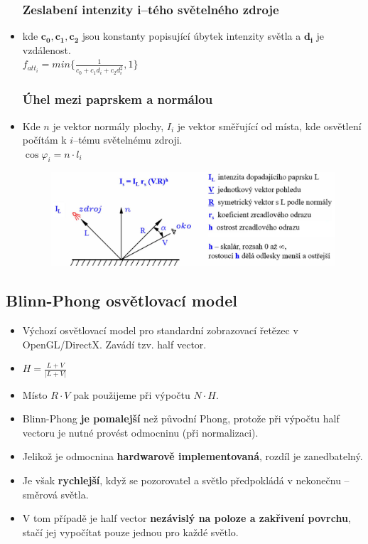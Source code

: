 \begin{itemize}
		 \subsubsection*{Zeslabení intenzity i--tého světelného zdroje}
		 \item kde $\mathbf{c_0,c_1,c_2}$ jsou konstanty popisující úbytek intenzity světla a $\mathbf{d_i}$ je vzdálenost. \\
		 $f_{att_i} = min \{\frac{1}{c_0+c_1d_i + c_2d_i^2}, 1\}$
		 \subsubsection*{Úhel mezi paprskem a normálou}
		 \item Kde $n$ je vektor normály plochy, $I_i$ je vektor směřující od místa, kde osvětlení počítám k $i$--tému světelnému zdroji. \\
		 $\cos{\varphi_i} = n \cdot l_i$
		 \begin{figure}[H]
		\centering
		\includegraphics[width=1\textwidth]{assets/1_phong_zrcadlo}
		\end{figure}
\end{itemize}

\subsection*{Blinn-Phong osvětlovací model}
\begin{itemize}
	\item Výchozí osvětlovací model pro standardní zobrazovací řetězec v OpenGL/DirectX. Zavádí tzv. half vector.
	\item $ H = \frac{L + V}{| L + V |}$
	\item Místo $R \cdot V$  pak použijeme při výpočtu $N \cdot H$.
	\item Blinn-Phong \textbf{je pomalejší} než původní Phong, protože při výpočtu half vectoru je nutné provést odmocninu (při normalizaci).
	\item Jelikož je odmocnina \textbf{hardwarově implementovaná}, rozdíl je zanedbatelný.
	\item Je však \textbf{rychlejší}, když se pozorovatel a světlo předpokládá v nekonečnu -- směrová světla.
	\item V tom případě je half vector \textbf{nezávislý na poloze a zakřivení povrchu}, stačí jej vypočítat pouze jednou pro každé světlo.
\end{itemize}

